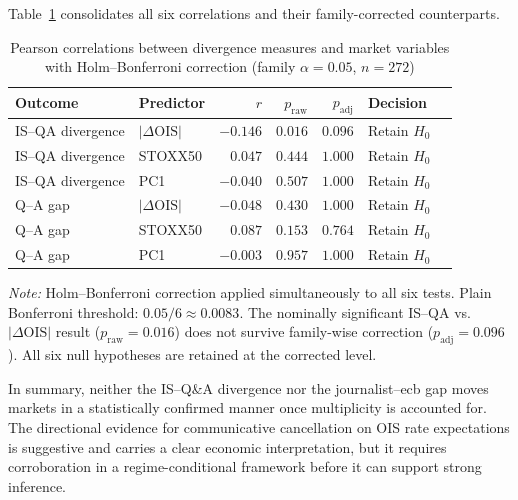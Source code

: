 Table~\ref{tab:holm_correction} consolidates all six correlations and their family-corrected counterparts.

\begin{table}[htbp]
    \centering
    \caption{%
        Pearson correlations between divergence measures and market variables
        with Holm--Bonferroni correction
        (family $\alpha = 0.05$, $n = 272$)}
    \label{tab:holm_correction}
    \small
    \begin{tabular}{llrrrll}
        \toprule
        Outcome           & Predictor            & $r$      & $p_{\mathrm{raw}}$ & $p_{\mathrm{adj}}$ & Decision       \\
        \midrule
        IS--QA divergence & $|\Delta\text{OIS}|$ & $-0.146$ & $0.016$            & $0.096$            & Retain $H_{0}$ \\
        IS--QA divergence & STOXX50              & $0.047$  & $0.444$            & $1.000$            & Retain $H_{0}$ \\
        IS--QA divergence & PC1                  & $-0.040$ & $0.507$            & $1.000$            & Retain $H_{0}$ \\
        \midrule
        Q--A gap          & $|\Delta\text{OIS}|$ & $-0.048$ & $0.430$            & $1.000$            & Retain $H_{0}$ \\
        Q--A gap          & STOXX50              & $0.087$  & $0.153$            & $0.764$            & Retain $H_{0}$ \\
        Q--A gap          & PC1                  & $-0.003$ & $0.957$            & $1.000$            & Retain $H_{0}$ \\
        \bottomrule
    \end{tabular}
    \par\smallskip
    \footnotesize\textit{Note:} Holm--Bonferroni correction applied
    simultaneously to all six tests. Plain Bonferroni threshold:
    $0.05/6 \approx 0.0083$. The nominally significant IS--QA
    vs.\ $|\Delta\text{OIS}|$ result ($p_{\mathrm{raw}} = 0.016$)
    does not survive family-wise correction
    ($p_{\mathrm{adj}} = 0.096$). All six null hypotheses are
    retained at the corrected level.
\end{table}

In summary, neither the IS--Q\&A divergence nor the journalist--\gls{ecb} gap moves markets in a statistically confirmed manner once multiplicity is accounted for. The directional evidence for communicative cancellation on OIS rate expectations is suggestive and carries a clear economic interpretation, but it requires corroboration in a regime-conditional framework before it can support strong inference.